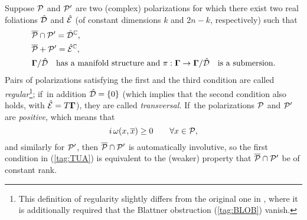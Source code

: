 \documentclass[12pt]{amsart}
\numberwithin{equation}{section}
\theoremstyle{remark}
\newcommand\Omg{{\bigam}}   %
\newcommand\PP{{\Cal P}}
\newcommand\DD{{\Cal D}}
\newcommand\EE{{\Cal E}}
\newcommand\GG{{\PP'}}
\newcommand\hatDD{{\hat\DD}}
\newcommand\hatEE{\hat\EE}
\newcommand{\CC}{\C}
\newcommand{\bigam}{\mbox{\boldmath $\Gamma$}}
\newcommand{\C}{\mathbb C}
\begin{document}
Suppose $\PP$ and $\GG$ are two (complex) polarizations for which there exist
two real foliations $\hatDD$ and $\hatEE$ (of constant dimensions $k$ and
$2n-k$, respectively) such that
\begin{equation}  \begin{aligned}
& \overline\PP\cap\GG = \hatDD^\CC, \\
& \overline\PP+\GG = \hatEE^\CC,  \\
& \Omg/\hatDD\text{ has a manifold structure and }\pi:\Omg\to \Omg/\hatDD\text{
is a submersion.}   \end{aligned}  \label{tag:TUA}  \end{equation}
Pairs of polarizations satisfying the first and the third condition are called
{\it regular\/}\footnote{This definition of regularity slightly differs from
the original one in \cite{bib:BlattLN}, where it is additionally required that
the Blattner obstruction (\ref{tag:BLOB}) vanish.}; if~in addition
$\hatDD=\{0\}$ (which implies that the second condition also holds, with
$\hatEE=T\Omg$), they are called {\it transversal.\/} If~the polarizations
$\PP$ and $\GG$ are {\it positive,\/} which means that
\begin{equation}  i\,\omega(x,\overline x)\ge0  \qquad\forall x\in\PP,
\label{tag:POSIT}  \end{equation}
and similarly for $\GG$, then $\overline\PP\cap\GG$ is automatically
involutive, so the first condition in (\ref{tag:TUA}) is equivalent to the
(weaker) property that $\overline\PP\cap\GG$ be of constant rank.
\end{document}
